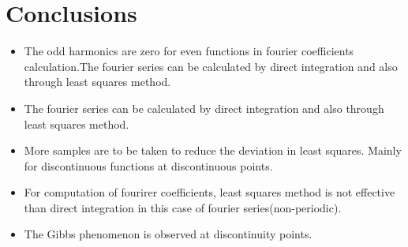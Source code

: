 \documentclass[11pt, a4paper]{article}
\begin{document}
\section*{Conclusions}
\begin{itemize}
\item The odd harmonics are zero for even functions in fourier coefficients calculation.The fourier series can be calculated by direct integration and also through least squares method.
\item The fourier series can be calculated by direct integration and also through least squares method.
\item More samples are to be taken to reduce the deviation in least squares. Mainly for discontinuous functions at discontinuous points.
\item For computation of fourirer coefficients, least squares method is not effective than direct integration in this case of fourier series(non-periodic).
\item The Gibbs phenomenon is observed at discontinuity points.
\end{itemize}
\end{document}
